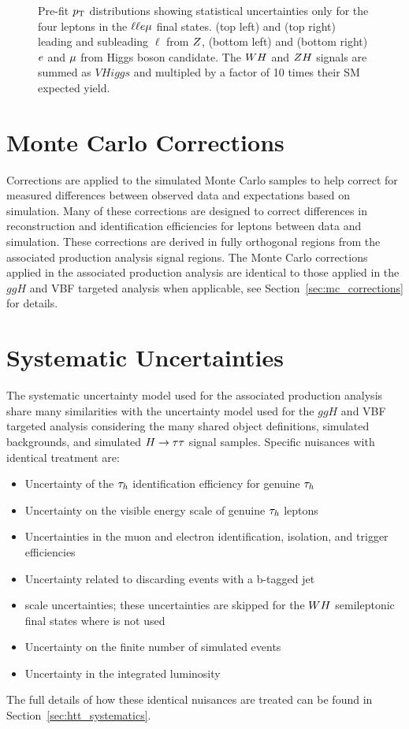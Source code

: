 \begin{figure}[htbp]
     \caption{
Pre-fit $p_\mathrm{T}$ distributions showing statistical uncertainties only for the 
four leptons in the $\ell\ell e\mu$ final states.
(top left) and (top right) leading and subleading $\ell$ from $Z$,
(bottom left) and (bottom right) $e$ and $\mu$ from Higgs boson candidate.
The $WH$ and $ZH$ signals are summed as $VHiggs$ and multipled by a factor of
10 times their SM expected yield.
     }
     \label{fig:llem_pts}
\end{figure}



\section{Monte Carlo Corrections}
\label{sec:vh_mc_corrections}
Corrections are applied to the simulated Monte Carlo samples to help correct for measured differences
between observed data and expectations based on simulation. Many of these corrections are designed
to correct differences in reconstruction and identification efficiencies for leptons between data
and simulation. These corrections are derived in
fully orthogonal regions from the associated production analysis signal regions.
The Monte Carlo corrections applied in the associated production analysis are identical to those
applied in the $ggH$ and VBF targeted analysis when applicable, see 
Section~\ref{sec:mc_corrections} for details.



\section{Systematic Uncertainties}
\label{sec:vh_systematics}
The systematic uncertainty model used for the associated production analysis share many
similarities with the uncertainty model used for the $ggH$ and VBF targeted analysis
considering the many shared object definitions, simulated backgrounds, and simulated $H\to\tau\tau$
signal samples.
Specific nuisances with identical treatment are:
\begin{itemize}
\item Uncertainty of the $\tau_{h}$ identification efficiency for genuine $\tau_{h}$
\item Uncertainty on the visible energy scale of genuine $\tau_{h}$ leptons
\item Uncertainties in the muon and electron identification, isolation, and trigger efficiencies
\item Uncertainty related to discarding events with a b-tagged jet
\item \etvecmiss scale uncertainties; these uncertainties are skipped for the
$WH$ semileptonic final states where \etvecmiss is not used
\item Uncertainty on the finite number of simulated events
\item Uncertainty in the integrated luminosity
\end{itemize}
The full details of how these identical nuisances are treated can be found in
Section~\ref{sec:htt_systematics}.


